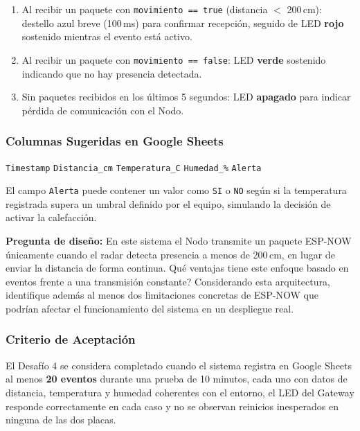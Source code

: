 \documentclass[12pt,leqno]{article}
\begin{document}
\begin{enumerate}[(1)]
    \item Al recibir un paquete con \texttt{movimiento == true} (distancia
    $<$ 200\,cm): destello azul breve (100\,ms) para confirmar recepci\'on,
    seguido de LED \textbf{rojo} sostenido mientras el evento est\'a activo.
    \item Al recibir un paquete con \texttt{movimiento == false}: LED \textbf{verde}
    sostenido indicando que no hay presencia detectada.
    \item Sin paquetes recibidos en los \'ultimos 5 segundos: LED \textbf{apagado}
    para indicar p\'erdida de comunicaci\'on con el Nodo.
\end{enumerate}

\subsubsection*{Columnas Sugeridas en Google Sheets}

\begin{center}
\texttt{Timestamp} \quad \texttt{Distancia\_cm} \quad \texttt{Temperatura\_C}
\quad \texttt{Humedad\_\%} \quad \texttt{Alerta}
\end{center}

\noindent El campo \texttt{Alerta} puede contener un valor como \texttt{SI} o
\texttt{NO} seg\'un si la temperatura registrada supera un umbral definido por
el equipo, simulando la decisi\'on de activar la calefacci\'on.

\noindent\textbf{Pregunta de dise\~no:} En este sistema el Nodo transmite un paquete
ESP-NOW \'unicamente cuando el radar detecta presencia a menos de 200\,cm, en lugar
de enviar la distancia de forma continua. \textquestiondown Qu\'e ventajas tiene
este enfoque basado en eventos frente a una transmisi\'on constante? Considerando
esta arquitectura, identifique adem\'as al menos dos limitaciones concretas de
ESP-NOW que podr\'ian afectar el funcionamiento del sistema en un despliegue real.

\subsubsection*{Criterio de Aceptaci\'on}

El Desaf\'io 4 se considera completado cuando el sistema registra en Google Sheets
al menos \textbf{20 eventos} durante una prueba de 10 minutos, cada uno con datos
de distancia, temperatura y humedad coherentes con el entorno, el LED del Gateway
responde correctamente en cada caso y no se observan reinicios inesperados en
ninguna de las dos placas.
\end{document}
